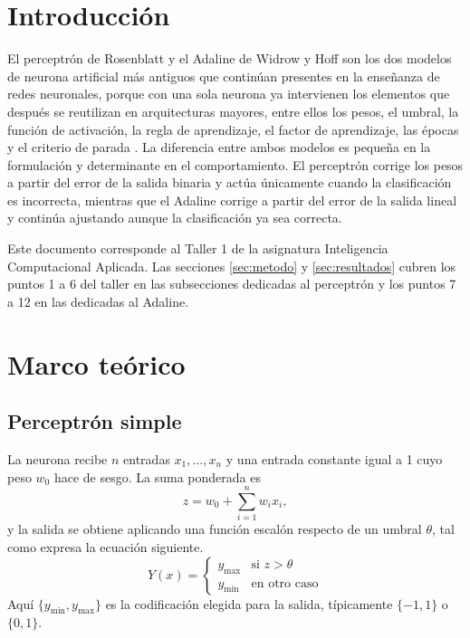 \documentclass[conference]{IEEEtran}
\begin{document}
\section{Introducci\'on}

El perceptr\'on de Rosenblatt \cite{rosenblatt1958} y el Adaline de Widrow y Hoff \cite{widrow1960} son los dos modelos de neurona artificial m\'as antiguos que contin\'uan presentes en la ense\~nanza de redes neuronales, porque con una sola neurona ya intervienen los elementos que despu\'es se reutilizan en arquitecturas mayores, entre ellos los pesos, el umbral, la funci\'on de activaci\'on, la regla de aprendizaje, el factor de aprendizaje, las \'epocas y el criterio de parada \cite{widrow1990}. La diferencia entre ambos modelos es peque\~na en la formulaci\'on y determinante en el comportamiento. El perceptr\'on corrige los pesos a partir del error de la salida binaria y act\'ua \'unicamente cuando la clasificaci\'on es incorrecta, mientras que el Adaline corrige a partir del error de la salida lineal y contin\'ua ajustando aunque la clasificaci\'on ya sea correcta.

Este documento corresponde al Taller 1 de la asignatura Inteligencia Computacional Aplicada. Las secciones \ref{sec:metodo} y \ref{sec:resultados} cubren los puntos 1 a 6 del taller en las subsecciones dedicadas al perceptr\'on y los puntos 7 a 12 en las dedicadas al Adaline.

\section{Marco te\'orico}
\label{sec:marco}

\subsection{Perceptr\'on simple}

La neurona recibe $n$ entradas $x_1,\dots,x_n$ y una entrada constante igual a 1 cuyo peso $w_0$ hace de sesgo. La suma ponderada es
\begin{equation}
  z = w_0 + \sum_{i=1}^{n} w_i x_i ,
\end{equation}
y la salida se obtiene aplicando una funci\'on escal\'on respecto de un umbral $\theta$, tal como expresa la ecuaci\'on siguiente.
\begin{equation}
  Y(x) = \begin{cases} y_{\max} & \text{si } z > \theta \\ y_{\min} & \text{en otro caso} \end{cases}
\end{equation}
Aqu\'i $\{y_{\min}, y_{\max}\}$ es la codificaci\'on elegida para la salida, t\'ipicamente $\{-1,1\}$ o $\{0,1\}$.
\end{document}
